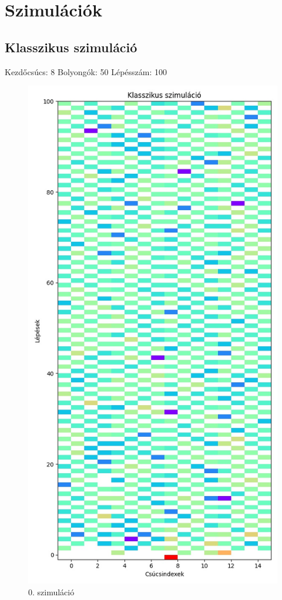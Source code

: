 \documentclass[14pt,a4paper]{article}
\begin{document}
\section{Szimulációk}
\subsection{Klasszikus szimuláció}
Kezdőcsúcs: 8
Bolyongók: 50
Lépésszám: 100
\begin{figure}[H]
\centering
\includegraphics[width = 0.7\columnwidth]{sim_00/counts.jpg}
\caption{0. szimuláció}
\end{figure}
\end{document}

